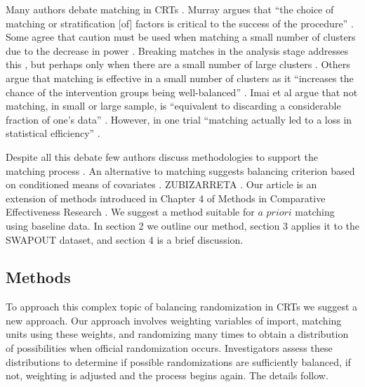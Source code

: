 \documentclass[]{sagej}
\begin{document}
Many authors debate matching in CRTs
\citep{balzer2012match, CRTrials2009, gatsonis2017methods, diehr1995breaking, murray1998design, imai2009essential, PMVsStrat, donner2007merits, klar1997merits, donner2000design, martin1993effect}.
Murray argues that ``the choice of matching or stratification {[}of{]}
factors is critical to the success of the procedure''
\citep{murray1998design}. Some agree that caution must be used when
matching a small number of clusters due to the decrease in power
\citep{donner2000design, klar1997merits, balzer2012match, martin1993effect}.
Breaking matches in the analysis stage addresses this
\citep{diehr1995breaking}, but perhaps only when there are a small
number of large clusters \citep{donner2007merits}. Others argue that
matching is effective in a small number of clusters as it ``increases
the chance of the intervention groups being well-balanced''
\citep{donner2007merits}. Imai et al argue that not matching, in small
or large sample, is ``equivalent to discarding a considerable fraction
of one's data'' \citep{imai2009essential}. However, in one trial
``matching actually led to a loss in statistical efficiency''
\citep[\citet{donner2000design}]{manun1994influence}.

Despite all this debate few authors discuss methodologies to support the
matching process \citep{raab2001balance}. An alternative to matching
suggests balancing criterion based on conditioned means of covariates
\citep{raab2001balance}. ZUBIZARRETA \citep{greevy2004optimal}. Our
article is an extension of methods introduced in Chapter 4 of Methods in
Comparative Effectiveness Research \citep{gatsonis2017methods}. We
suggest a method suitable for \(a\) \(priori\) matching using baseline
data. In section 2 we outline our method, section 3 applies it to the
SWAPOUT dataset, and section 4 is a brief discussion.

\subsection{Methods }\label{methods}

To approach this complex topic of balancing randomization in CRTs we
suggest a new approach. Our approach involves weighting variables of
import, matching units using these weights, and randomizing many times
to obtain a distribution of possibilities when official randomization
occurs. Investigators assess these distributions to determine if
possible randomizations are sufficiently balanced, if not, weighting is
adjusted and the process begins again. The details follow.
\end{document}
